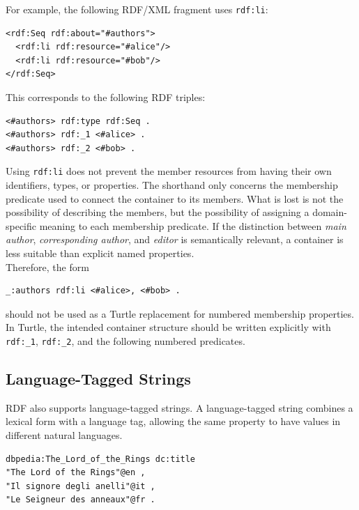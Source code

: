\documentclass{scrbook}
\begin{document}
	For example, the following RDF/XML fragment uses \texttt{rdf:li}:
	
	\begin{lstlisting}
<rdf:Seq rdf:about="#authors">
  <rdf:li rdf:resource="#alice"/>
  <rdf:li rdf:resource="#bob"/>
</rdf:Seq>
	\end{lstlisting}
	
	This corresponds to the following RDF triples:
	
	\begin{lstlisting}
<#authors> rdf:type rdf:Seq .
<#authors> rdf:_1 <#alice> .
<#authors> rdf:_2 <#bob> .
	\end{lstlisting}
	
	Using \texttt{rdf:li} does not prevent the member resources from having their own identifiers, types, or properties. The shorthand only concerns the membership predicate used to connect the container to its members. What is lost is not the possibility of describing the members, but the possibility of assigning a domain-specific meaning to each membership predicate. If the distinction between \emph{main author}, \emph{corresponding author}, and \emph{editor} is semantically relevant, a container is less suitable than explicit named properties.\\
	
	Therefore, the form
	
	\begin{lstlisting}
_:authors rdf:li <#alice>, <#bob> .
	\end{lstlisting}
	
	should not be used as a Turtle replacement for numbered membership properties. In Turtle, the intended container structure should be written explicitly with \texttt{rdf:\_1}, \texttt{rdf:\_2}, and the following numbered predicates.
	
	\subsection{Language-Tagged Strings}
	
	RDF also supports language-tagged strings. A language-tagged string combines a lexical form with a language tag, allowing the same property to have values in different natural languages.
	
	\begin{lstlisting}
dbpedia:The_Lord_of_the_Rings dc:title
"The Lord of the Rings"@en ,
"Il signore degli anelli"@it ,
"Le Seigneur des anneaux"@fr .
	\end{lstlisting}
	
\end{document}
